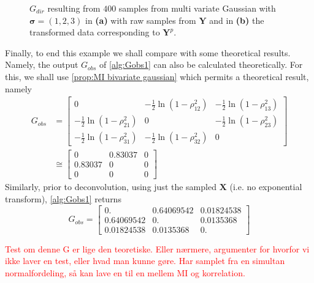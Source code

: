 \documentclass[../Thesis.tex]{subfiles}
\begin{document}
\begin{figure}[H]
\begin{subfigure}[t]{0.49\textwidth}
        \caption{}
        \label{fig:Gaussian 3x3 large s power}
    \end{subfigure}
    \caption{$G_{dir}$ resulting from $400$ samples from multi variate Gaussian with $\boldsymbol\sigma = (1,2,3)$ in \textbf{(a)} with raw samples from $\boldsymbol Y$ and in \textbf{(b)} the transformed data corresponding to $\boldsymbol Y^p$.}
    \label{fig:Gaussian 3x3 large s G_dir differences}
\end{figure}
Finally, to end this example we shall compare with some theoretical results. Namely, the output $G_{obs}$ of \autoref{alg:Gobs1} can also be calculated theoretically. For this, we shall use \autoref{prop:MI bivariate gaussian} which permits a theoretical result, namely
\begin{align*}
    G_{obs} & =
    \begin{bmatrix}
        0                                              & -\frac{1}{2} \ln \left( 1 - \rho_{12}^2\right) & -\frac{1}{2} \ln \left( 1 - \rho_{13}^2\right) \\
        -\frac{1}{2} \ln \left( 1 - \rho_{21}^2\right) & 0                                              & -\frac{1}{2} \ln \left( 1 - \rho_{23}^2\right) \\
        -\frac{1}{2} \ln \left( 1 - \rho_{31}^2\right) & -\frac{1}{2} \ln \left( 1 - \rho_{32}^2\right) & 0
    \end{bmatrix} \\
            & \cong
    \begin{bmatrix}
        0       & 0.83037 & 0 \\
        0.83037 & 0       & 0 \\
        0       & 0       & 0
    \end{bmatrix}
\end{align*}
Similarly, prior to deconvolution, using just the sampled $\boldsymbol X$ (i.e. no exponential transform), \autoref{alg:Gobs1} returns
$$G_{obs} =
    \begin{bmatrix}
        0.         & 0.64069542 & 0.01824538 \\
        0.64069542 & 0.         & 0.0135368  \\
        0.01824538 & 0.0135368  & 0.
    \end{bmatrix}
$$

\textcolor{red}{Test om denne G er lige den teoretiske. Eller nærmere, argumenter for hvorfor vi ikke laver en test, eller hvad man kunne gøre. Har samplet fra en simultan normalfordeling, så kan lave en til en mellem MI og korrelation. }
\end{document}
